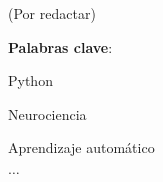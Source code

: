 (Por redactar)

\mbox{} \bigskip

\noindent \textbf{Palabras clave}:
\begin{compactitem}
    \item Python
    \item Neurociencia
    \item Aprendizaje automático
    \item $\ldots$
\end{compactitem}